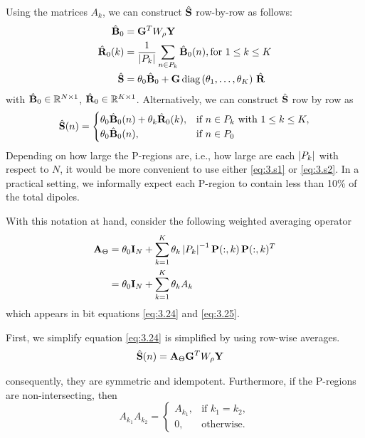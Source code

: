 
Using the matrices $A_k$, we can construct $\hat{\mathbf{S}}$ row-by-row as follows:
\begin{align}
    \hat{\mathbf{B}}_0
    &=
    \mathbf{G}^T W_\rho \mathbf{Y} \\
    \hat{\mathbf{R}}_0(k)
    &=
    {\displaystyle \frac{1}{\left| {P_k} \right|} \sum_{n\in P_k} \hat{\mathbf{B}}_0(n)},
    \text{for } 1\leq k \leq K
    \\
    \hat{\mathbf{S}}
    &=
    \theta_0 \hat{\mathbf{B}}_0 + \mathbf{G}\, \text{diag}\left( \theta_1, \dots, \theta_K \right)\, \hat{\mathbf{R}}
    \label{eq:3.s1}
\end{align}
with $\hat{\mathbf{B}}_0 \in \mathbb{R}^{N\times 1}$, $\hat{\mathbf{R}}_0 \in \mathbb{R}^{K\times 1}$.
%
Alternatively, we can construct $\hat{\mathbf{S}}$ row by row as
\begin{equation}
    \hat{\mathbf{S}}(n) =
    \begin{cases}
        \theta_0 \hat{\mathbf{B}}_0(n) + \theta_k \hat{\mathbf{R}}_0(k),
        &\text{if } n\in P_k \text{ with } 1\leq k \leq K,
        \\
        \theta_0 \hat{\mathbf{B}}_0(n), &\text{if } n\in P_0
    \end{cases}
    \label{eq:3.s2}
\end{equation}
Depending on how large the P-regions are, i.e., how large are each $\left| {P_k} \right|$ with respect to $N$, it would be more convenient to use
either \eqref{eq:3.s1} or \eqref{eq:3.s2}.
%
In a practical setting, we informally expect each P-region to contain less than 10\% of the total dipoles.




With this notation at hand, consider the following weighted averaging operator
\begin{align}
    \mathbf{A}_\Theta 
    &=
    \theta_0 \mathbf{I}_N + \sum_{k=1}^K \theta_k \left| {P_k} \right|^{-1} 
    \mathbf{P}(:,k)\, \mathbf{P}(:,k)^T
    \nonumber \\
    &=
    \theta_0 \mathbf{I}_N + \sum_{k=1}^K \theta_k A_k
\end{align}
which appears in bit equations \eqref{eq:3.24} and \eqref{eq:3.25}.

First, we simplify equation \eqref{eq:3.24} is simplified by using row-wise averages.
%
\begin{align}
    \hat{\mathbf{S}} (n)
    &=
    \mathbf{A}_\Theta \mathbf{G}^T W_\rho \mathbf{Y}
    \nonumber 
\end{align}


consequently, they are symmetric and idempotent.
Furthermore, if the P-regions are non-intersecting, then
\begin{equation}
    A_{k_1} A_{k_2} = 
    \begin{cases}
        A_{k_1}, &\text{if } k_1=k_2, \\
        0, &\text{otherwise.}
    \end{cases}
    \label{eq:3.27}
\end{equation}

